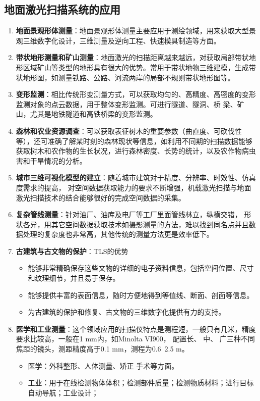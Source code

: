 \subsection{地面激光扫描系统的应用}
\begin{enumerate}
	\item \textbf{地面景观形体测量}：地面景观形体测量主要应用于测绘领域，用来获取大型景观三维数字化设计，三维测量及逆向工程、快速模具制造等方面。
	\item \textbf{带状地形测量和矿山测量}：地面激光的扫描距离越来越远，对获取局部带状地形区域矿山等类型的地形具有很大的优势。常用于带状地物三维建模，生成带状地形图，如测量铁路、公路、河流两岸的局部不规则带状地形图等。
	\item \textbf{变形监测}：相比传统形变测量方式，可以获取均匀的、高精度、高密度的变形监测对象的点云数据，用于整体变形监测。可进行隧道、隧洞、桥 梁、矿山，尤其是地铁隧道和高铁桥梁的变形监测。
	\item \textbf{森林和农业资源调查}：可以获取表征树木的重要参数（曲直度、可砍伐性等），还可准确了解某时刻的森林现状等信息，如利用不同期的扫描数据能够获取树木和农作物的生长状况，进行森林密度、长势的统计，以及农作物病虫害和干旱情况的分析。
	\item \textbf{城市三维可视化模型的建立}：随着城市建筑对于精度、分辨率、时效性、仿真度需求的提高，
	对空间数据获取能力的要求不断增强，机载激光扫描与地面激光扫描技术的结合能够很好的完成空间数据的采集。
	\item \textbf{复杂管线测量}：针对油厂、油库及电厂等工厂里面管线林立，纵横交错，
	形状各异，用其它空间数据获取技术如摄影测量的方法，难以找到同名点并且数据处理的复杂度也非常高，其他传统的测量方法更是效率低下。
	\item \textbf{古建筑与古文物的保护}：TLS的优势
		\begin{itemize}
			\item 能够非常精确保存这些文物的详细的电子资料信息，包括空间位置、尺寸和纹理细节，并且易于保存。
			\item 能够提供丰富的表面信息，随时方便地得到等值线、断面、剖面等信息。
			\item 为古建筑的保护和修复、古文物的三维数字化提供有力的支持。
		\end{itemize}
	\item \textbf{医学和工业测量}：这个领域应用的扫描仪特点是测程短，一般只有几米，精度要求比较高，一般在1 mm内，如Minolta VI900， 配置长、 中、 广三种不同焦距的镜头，测距精度高于0.1 mm，测程为0.6~2.5 m。
		\begin{itemize}
			\item 医学：外科整形、人体测量、矫正 手术等方面。
			\item 工业：用于在线检测物体体积；检测部件质量；检测物质材料；进行目标自动导航；工业设计；
		\end{itemize}
\end{enumerate}

